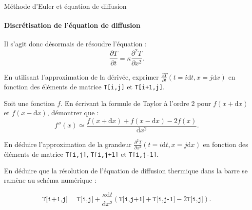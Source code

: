 \begin{exo}[1][python]{Méthode d'Euler et équation de diffusion}
      \paragraph{Discrétisation de l'équation de diffusion}
      Il s'agit donc désormais de résoudre l'équation :
      $$\frac{\partial T}{\partial t} = \kappa \frac{\partial^2 T}{\partial x^2}.$$
      \begin{questions}
        \item En utilisant l'approximation de la dérivée, exprimer $\frac{\partial T}{\partial t}(t=i\mathrm{d}t,x=j\mathrm{d}x)$ en fonction des éléments de matrice \texttt{T[i,j]} et \texttt{T[i+1,j]}.
        \item Soit une fonction $f$. En écrivant la formule de Taylor à l’ordre 2 pour $f(x+\mathrm{d} x)$ et $f(x-\mathrm{d} x)$, démontrer que : 
        $$ f''(x)\simeq\frac{f(x+\mathrm{d} x)+f(x-\mathrm{d} x)-2f(x)}{\mathrm{d} x^2}.$$
        \item En déduire l'approximation de la grandeur $\frac{\partial^2 T}{\partial x^2}(t=i\mathrm{d}t,x=j\mathrm{d}x)$ en fonction des éléments de matrice \texttt{T[i,j]}, \texttt{T[i,j+1]} et  \texttt{T[i,j-1]}.
        \item En déduire que la résolution de l'équation de diffusion thermique dans la barre se ramène au schéma numérique :
        \begin{center}
          $$ \boxed{
            \texttt{T[i+1,j]}=\texttt{T[i,j]}+\frac{\kappa \mathrm{d}t}{\mathrm{d}x^2} \left( \texttt{T[i,j+1]}+\texttt{T[i,j-1]}-2\texttt{T[i,j]}\right).
            }$$
        \end{center}
      \end{questions}
    

\end{exo}
